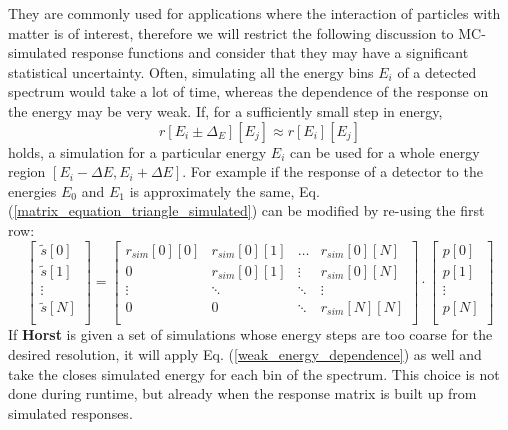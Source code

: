 \documentclass{article}
\begin{document}
They are commonly used for applications where the interaction of particles with matter is of interest, therefore we will restrict the following discussion to MC-simulated response functions and consider that they may have a significant statistical uncertainty.
Often, simulating all the energy bins $E_i$ of a detected spectrum would take a lot of time, whereas the dependence of the response on the energy may be very weak.
If, for a sufficiently small step in energy,
%
\begin{equation}
\label{weak_energy_dependence}
r[E_i \pm \Delta_E][E_j] \approx r[E_i][E_j]
\end{equation}
%
holds, a simulation for a particular energy $E_i$ can be used for a whole energy region $\left[ E_i - \Delta E, E_i + \Delta E \right]$.
For example if the response of a detector to the energies $E_0$ and $E_1$ is approximately the same, Eq. (\ref{matrix_equation_triangle_simulated}) can be modified by re-using the first row:
%
\begin{equation}
	\label{matrix_equation_triangle_approximation}
	\left[ 
		\begin{array}{c}
			\tilde{s}[0] \\
			\tilde{s}[1] \\
			\vdots	\\
			\tilde{s}[N] \\
		\end{array}
	\right]
	= 
	\begin{bmatrix}
		r_{sim}[0][0] & r_{sim}[0][1] & \hdots & r_{sim}[0][N] \\
		0       & r_{sim}[0][1] & \vdots & r_{sim}[0][N] \\
		\vdots  & \ddots  & \ddots & \vdots  \\
		0       & 0       & \ddots & r_{sim}[N][N] \\
	\end{bmatrix}
	\cdot
	\left[ 
		\begin{array}{c}
			p[0] \\
			p[1] \\
			\vdots	\\
			p[N] \\
		\end{array}
	\right]
\end{equation}
%
If \textbf{Horst} is given a set of simulations whose energy steps are too coarse for the desired resolution, it will apply Eq. (\ref{weak_energy_dependence}) as well and take the closes simulated energy for each bin of the spectrum.
This choice is not done during runtime, but already when the response matrix is built up from simulated responses.
\end{document}
